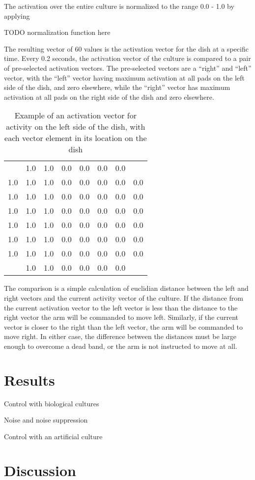 \documentclass[letterpaper]{article}
\begin{document}
The activation over the entire culture is normalized to the range 0.0 - 1.0 by applying

TODO normalization function here

The resulting vector of 60 values is the activation vector for the dish at a specific time.
Every 0.2 seconds, the activation vector of the culture is compared to a pair of pre-selected activation vectors. 
The pre-selected vectors are a ``right'' and ``left'' vector, with the ``left'' vector having maximum activation at all pads on the left side of the dish, and zero elsewhere, while the ``right'' vector has maximum activation at all pads on the right side of the dish and zero elsewhere. 

\begin{table}
\begin{tabular}{cccccccc}
 & 1.0 & 1.0 & 0.0 & 0.0 & 0.0 & 0.0 &  \\ 
1.0 & 1.0 & 1.0 & 0.0 & 0.0 & 0.0 & 0.0 & 0.0 \\ 
1.0 & 1.0 & 1.0 & 0.0 & 0.0 & 0.0 & 0.0 & 0.0 \\ 
1.0 & 1.0 & 1.0 & 0.0 & 0.0 & 0.0 & 0.0 & 0.0 \\ 
1.0 & 1.0 & 1.0 & 0.0 & 0.0 & 0.0 & 0.0 & 0.0 \\ 
1.0 & 1.0 & 1.0 & 0.0 & 0.0 & 0.0 & 0.0 & 0.0 \\ 
1.0 & 1.0 & 1.0 & 0.0 & 0.0 & 0.0 & 0.0 & 0.0 \\ 
 & 1.0 & 1.0 & 0.0 & 0.0 & 0.0 & 0.0 &  \\ 
\end{tabular}
\caption{Example of an activation vector for activity on the left side of the dish, with each vector element in its location on the dish} 
\end{table}

The comparison is a simple calculation of euclidian distance between the left and right vectors and the current activity vector of the culture. 
If the distance from the current activation vector to the left vector is less than the distance to the right vector the arm will be commanded to move left. 
Similarly, if the current vector is closer to the right than the left vector, the arm will be commanded to move right. 
In either case, the difference between the distances must be large enough to overcome a dead band, or the arm is not instructed to move at all. 



\section{Results}

Control with biological cultures

Noise and noise suppression

Control with an artificial culture

\section{Discussion}


\end{document}
